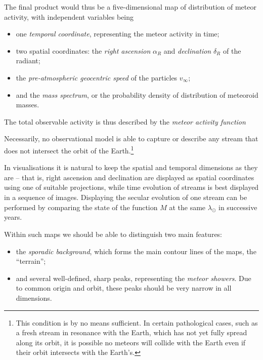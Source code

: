     The final product would thus be a five-dimensional map of distribution of meteor activity, with independent variables being
    \begin{itemize}
        \item one \emph{temporal coordinate}, representing the meteor activity in time;
        \item two spatial coordinates: the \emph{right ascension} $\alpha_R$ and \emph{declination} $\delta_R$ of the radiant;
        \item the \emph{pre-atmospheric geocentric speed} of the particles $v_\infty$;
        \item and the \emph{mass spectrum}, or the probability density of distribution of meteoroid masses.
    \end{itemize}

    The total observable activity is thus described by the \emph{meteor activity function}

    Necessarily, no observational model is able to capture or describe any stream that does not intersect the orbit of the
    Earth.\footnote{This condition is by no means sufficient. In certain pathological cases, such as a fresh stream in resonance
    with the Earth, which has not yet fully spread along its orbit, it is possible no meteors will collide with the Earth even
    if their orbit intersects with the Earth's.}

    In visualisations it is natural to keep the spatial and temporal dimensions as they are -- that is,
    right ascension and declination are displayed as spatial coordinates using one of suitable projections,
    while time evolution of streams is best displayed in a sequence of images.
    Displaying the secular evolution of one stream can be performed by comparing the state of the function $M$ at
    the same $\lambda_\odot$ in successive years.

    Within such maps we should be able to distinguish two main features:
    \begin{itemize}
        \item the \emph{sporadic background}, which forms the main contour lines of the maps, the ``terrain'';
        \item and several well-defined, sharp peaks, representing the \emph{meteor showers}. Due to common origin and orbit,
            these peaks should be very narrow in all dimensions.
    \end{itemize}


